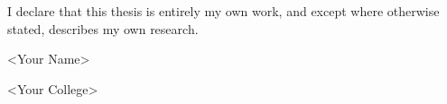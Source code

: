 \documentclass[../ThesisMain]{subfiles}
\begin{document}
\doublespacing%
\begin{declaration}
I declare that this thesis is entirely my own work, and except where otherwise stated, describes my own research.

\vspace{20pt}

<Your Name>

<Your College>
\end{declaration}
\newpage   
\end{document}
